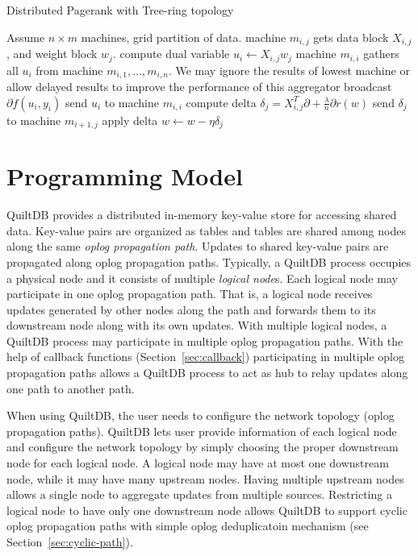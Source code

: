 \documentclass[11pt, twocolumn]{article}
\begin{document}
\begin{algorithm}[tb]
  \caption{Distributed Pagerank with Tree-ring topology}
  \label{algo:loss}
  \begin{algorithmic}[1]
    \REQUIRE Assume $n \times m$ machines, grid partition of data. machine
    $m_{i,j}$  gets data block $X_{i,j}$, and weight block $w_j$.
    \STATE compute dual variable $u_i \gets X_{i,j} w_j$
    \STATE machine $m_{i,i}$ gathers all $u_i$ from machine $m_{i,1}, \ldots,
    m_{i,n}$. We may ignore the results of lowest machine or allow delayed
    results to improve the performance of this aggregator
    \STATE broadcast $\partial f(u_i, y_i)$
    \ELSE
    \STATE send $u_i$ to machine $m_{i,i}$
    \ENDIF
    \STATE compute delta $\delta_j = X_{i,j}^T \partial +
    \frac{\lambda}{n} \partial r(w)$
    \STATE send $\delta_j$ to machine $m_{i+1,j}$
    \STATE apply delta $w \gets w - \eta \delta_j$
    \ENDFOR
    \ENDFOR
  \end{algorithmic}
\end{algorithm}

\section{Programming Model}

QuiltDB provides a distributed in-memory key-value store for accessing shared
data. Key-value pairs are organized as tables and tables are shared among
nodes along the same \emph{oplog propagation path}. Updates to shared key-value
pairs are propagated along {oplog propagation path}s. Typically, a QuiltDB
process occupies a physical node and it
consists of multiple \emph{logical node}s. Each {logical node} may
participate in one {oplog propagation path}. That is, a {logical node}
receives updates generated by other nodes along the path and forwards them to
its downstream node along with its own updates. With multiple {logical
node}s, a QuiltDB process may participate in multiple {oplog propagation
path}s. With the help of callback functions (Section~\ref{sec:callback})
participating in multiple {oplog propagation path}s
allows a QuiltDB process to act as hub to relay updates along one path to
another path.

When using QuiltDB, the user needs to configure the network topology
({oplog propagation path}s). QuiltDB lets user provide information of
each {logical node} and configure the network topology by simply choosing
the proper downstream node for each {logical node}. A {logical node}
may have at most one downstream node, while it may have many upstream nodes.
Having multiple upstream nodes allows a single node to aggregate updates from
multiple sources. Restricting a {logical node} to have only one downstream
node allows QuiltDB to support cyclic {oplog propagation path}s with simple
oplog deduplicatoin mechanism (see Section~\ref{sec:cyclic-path}).
\end{document}
